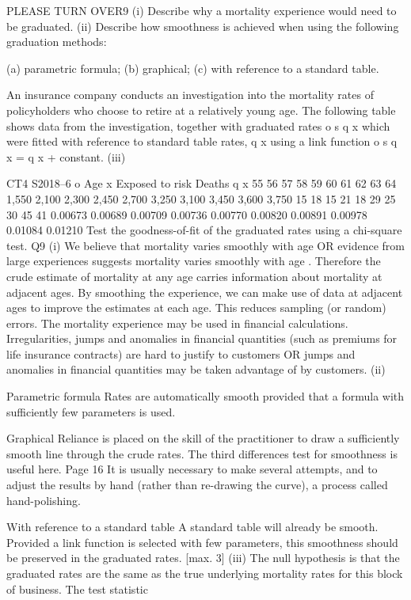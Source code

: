\documentclass[a4paper,12pt]{article}
\begin{document}
PLEASE TURN OVER9
(i) Describe why a mortality experience would need to be graduated.
(ii) Describe how smoothness is achieved when using the following graduation
methods:

(a)
parametric formula;
(b)
graphical;
(c)
with reference to a standard table.

An insurance company conducts an investigation into the mortality rates of
policyholders who choose to retire at a relatively young age.
The following table shows data from the investigation, together with graduated rates
o
s
q x which were fitted with reference to standard table rates, q x using a link function
o
s
q x = q x + constant.
(iii)

CT4 S2018–6
o
Age x Exposed to risk Deaths q x
55
56
57
58
59
60
61
62
63
64 1,550
2,100
2,300
2,450
2,700
3,250
3,100
3,450
3,600
3,750 15
18
15
21
18
29
25
30
45
41 0.00673
0.00689
0.00709
0.00736
0.00770
0.00820
0.00891
0.00978
0.01084
0.01210
Test the goodness-of-fit of the graduated rates using a chi-square test.
Q9
(i)
We believe that mortality varies smoothly with age
OR
evidence from large experiences suggests mortality varies
smoothly with age
. 
Therefore the crude estimate of mortality at any age carries
information about mortality at adjacent ages. 
By smoothing the experience, we can make use of data at
adjacent ages to improve the estimates at each age. 
This reduces sampling (or random) errors. 
The mortality experience may be used in financial calculations. 
Irregularities, jumps and anomalies in financial quantities
(such as premiums for life insurance contracts) are hard to justify to
customers
OR
jumps and anomalies in financial quantities may be taken advantage of
by customers.
(ii)


Parametric formula
Rates are automatically smooth provided that a formula with
sufficiently few parameters is used.

Graphical
Reliance is placed on the skill of the practitioner
to draw a sufficiently smooth line through the crude rates. 
The third differences test for smoothness is useful here. 
Page 16
It is usually necessary to make several attempts,
and to adjust the results by hand (rather than re-drawing the curve),
a process called hand-polishing.

With reference to a standard table
A standard table will already be smooth. 
Provided a link function is selected with few parameters,
this smoothness should be preserved in the graduated rates. 
[max. 3]
(iii)
The null hypothesis is that the graduated rates are the same as the true
underlying mortality rates for this block of business.
The test statistic
\end{document}

